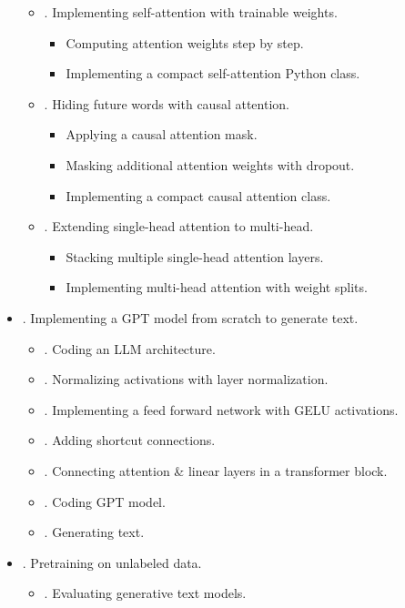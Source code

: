 \documentclass{article}
\begin{document}
\begin{itemize}
\begin{itemize}
\begin{itemize}
		\end{itemize}
		\item {. Implementing self-attention with trainable weights.}
		\begin{itemize}
			\item {\sf Computing attention weights step by step.}
			\item {\sf Implementing a compact self-attention Python class.}
		\end{itemize}
		\item {. Hiding future words with causal attention.}
		\begin{itemize}
			\item {\sf Applying a causal attention mask.}
			\item {\sf Masking additional attention weights with dropout.}
			\item {\sf Implementing a compact causal attention class.}
		\end{itemize}
		\item {. Extending single-head attention to multi-head.}
		\begin{itemize}
			\item {\sf Stacking multiple single-head attention layers.}
			\item {\sf Implementing multi-head attention with weight splits.}
		\end{itemize}
	\end{itemize}
	\item {. Implementing a GPT model from scratch to generate text.}
	\begin{itemize}
		\item {. Coding an LLM architecture.}
		\item {. Normalizing activations with layer normalization.}
		\item {. Implementing a feed forward network with GELU activations.}
		\item {. Adding shortcut connections.}
		\item {. Connecting attention \& linear layers in a transformer block.}
		\item {. Coding GPT model.}
		\item {. Generating text.}
	\end{itemize}
	\item {. Pretraining on unlabeled data.}
	\begin{itemize}
		\item {. Evaluating generative text models.}

\end{itemize}
\end{itemize}
\end{document}
